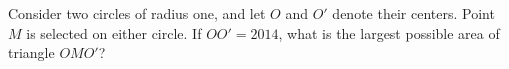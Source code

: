 Consider two circles of radius one, and let $O$ and $O'$ denote their centers.  Point $M$ is selected on either circle.  If $OO' = 2014$, what is the largest possible area of triangle $OMO'$?
